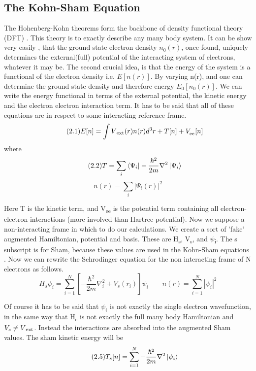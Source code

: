 \documentclass[12pt]{article}
\begin{document}
\subsection{The Kohn-Sham Equation}
The Hohenberg-Kohn theorems form the backbone of density functional theory (DFT) \cite{inhom}. This theory is to exactly describe any many body system. It can be show very easily \cite{martin}, that the ground state electron density $n_0(r)$, once found, uniquely determines the external(full) potential of the interacting system of electrons, whatever it may be. The second crucial idea, is that the energy of the system is a functional of the electron density i.e. $E[n(r)]$. By varying n(r), and one can determine the ground state density and therefore energy $E_0[n_0(r)]$.
We can write the energy functional in terms of the external potential, the kinetic energy and the electron electron interaction term. It has to be said that all of these equations are in respect to some interacting reference frame.
\begin{equation} \label{2.1} \tag{2.1}
E[n]=\int V\textsubscript{ext}(r)n(r)d^3r + T[n] + V_\textsubscript{ee}[n]
\end{equation}
where 
\begin{equation} \label{2.2} \tag{2.2}
T=\sum_{i} \bra{\Psi_i}-\frac{\hbar^2}{2m}\nabla ^2 \ket{\Psi_i} 
\end{equation}
\begin{equation} \label{2.3} \tag{2.3}
n(r)=\sum_{i} | \Psi_i(r) |^2 
\end{equation}

Here T is the kinetic term, and V\textsubscript{ee} is the potential term containing all electron-electron interactions (more involved than Hartree potential). Now we suppose a non-interacting frame in which to do our calculations. We create a sort of 'fake' augmented Hamiltonian, potential and basis. These are H\textsubscript{s}, V\textsubscript{s}, and $\psi$\textsubscript{i}. The s subscript is for Sham, because these values are used in the Kohn-Sham equations \cite{inhom}. Now we can rewrite the Schrodinger equation for the non interacting frame of N electrons as follows.
\begin{equation} \label{2.4} \tag{2.4}
H_s\psi_i = \sum_{i=1}^{N} [-\frac{\hbar^2}{2m}\nabla_i ^2 + V_s(r_i)] \psi_i \qquad n(r)=\sum_{i=1}^{N} |\psi_i|^2 
\end{equation}

Of course it has to be said that $\psi_i$ is not exactly the single electron wavefunction, in the same way that H\textsubscript{s} is not exactly the full many body Hamiltonian and $V_s \neq V\textsubscript{ext}$. Instead the interactions are absorbed into the augmented Sham values. The sham kinetic energy will be
\begin{equation} \label{2.5} \tag{2.5}
T_s[n]=\sum_{i=1}^{N} -\frac{\hbar^2}{2m}\nabla^2\ket{\psi_i}
\end{equation}
\end{document}

